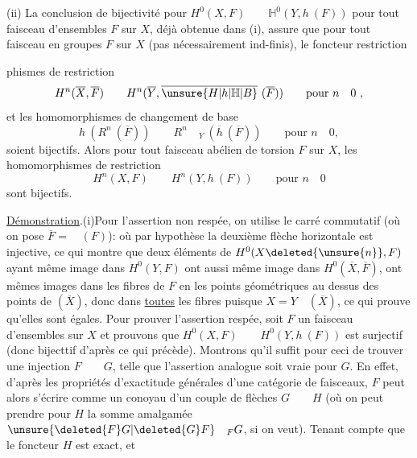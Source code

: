 (ii) La conclusion de bijectivité pour $H^0(X,F)\qquad\mathbb{H}^0(Y,h\ (F))$ \margin{\handwritten{$\unsure{\checkmark|\backslash}$}}pour tout faisceau d'ensembles $F$ sur $X$, déjà obtenue dans (i), assure  que pour tout faisceau en groupes $F$ sur $X$ (pas nécessairement ind-finis), le foncteur restriction

phismes de restriction
\[
H^n(\overline{X},\overline{F})\qquad H^n(\overline{Y},\overline{\unsure{H|h|\mathbb{H}|B}}\ (\overline{F}))\qquad\text{pour }n\quad0\ ,
\]
et les homomorphismes de changement de base
\[
h\ (R^n\ (\overline{F}))\qquad R^n\quad{}_{Y}\ (\overline{h}\ (\overline{F}))\qquad\text{pour }n\quad0,
\]
soient bijectifs. Alors pour tout faisceau abélien de torsion $F$ sur $X$, les homomorphismes de restriction
\[
H^n(X,F)\qquad H^n(Y,h\ (F))\qquad\text{pour }n\quad0
\]
sont  bijectifs.

\uline{Démonstration}.\quad (i)\quad Pour l'assertion non respée, on utilise le carré commutatif (où on pose $\overline{F}=\quad(F)$):
où par hypothèse la deuxième flèche horizontale est injective, ce qui montre que deux éléments de $H^0(X\deleted{\unsure{n}},F)$ ayant même image dans $H^0(Y,F)$ ont aussi même image dans $H^0(\overline{X},\overline{F})$,  ont mêmes images dans les fibres  de $F$ en les points géométriques au dessus des points de $(\overline{X})$, donc dans \uline{toutes} les fibres puisque $X=Y\quad(\overline{X})$, ce qui prouve qu'elles sont égales. Pour prouver l'assertion respée, soit $F$ un faisceau d'ensembles sur $X$ et prouvons que $H^0(X,F)\qquad H^0(Y,h\ (F))$ est surjectif (donc bijecttif d'après ce qui précède). Montrons qu'il suffit pour ceci de trouver une injection $F\qquad G$, telle que l'assertion analogue soit vraie pour $G$. En effet, d'après les propriétés d'exactitude générales d'une catégorie de faisceaux, $F$ peut alors s'écrire comme un conoyau d'un couple de flèches $G\qquad H$ (où on peut prendre pour $H$ la somme amalgamée $\unsure{\deleted{F}G|\deleted{G}F}\quad{}_{F}G$, si on veut). Tenant compte que le foncteur $H$ est exact,  et
